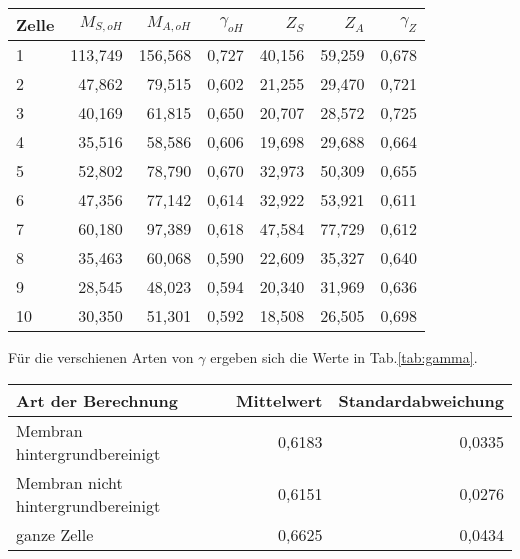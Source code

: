 \begin{center}
    \centering
    \begin{tabular}{lrrrrrr}
        \toprule
        Zelle &  $M_{S,oH}$ &  $M_{A,oH}$ &  $\gamma_{oH}$ &   $Z_S$ &   $Z_A$ &  $\gamma_Z$ \\
        \midrule
        1     & 113,749 & 156,568 &     0,727 & 40,156 & 59,259 &    0,678 \\
        2     &  47,862 &  79,515 &     0,602 & 21,255 & 29,470 &    0,721 \\
        3     &  40,169 &  61,815 &     0,650 & 20,707 & 28,572 &    0,725 \\
        4     &  35,516 &  58,586 &     0,606 & 19,698 & 29,688 &    0,664 \\
        5     &  52,802 &  78,790 &     0,670 & 32,973 & 50,309 &    0,655 \\
        6     &  47,356 &  77,142 &     0,614 & 32,922 & 53,921 &    0,611 \\
        7     &  60,180 &  97,389 &     0,618 & 47,584 & 77,729 &    0,612 \\
        8     &  35,463 &  60,068 &     0,590 & 22,609 & 35,327 &    0,640 \\
        9     &  28,545 &  48,023 &     0,594 & 20,340 & 31,969 &    0,636 \\
        10    &  30,350 &  51,301 &     0,592 & 18,508 & 26,505 &    0,698 \\
        \bottomrule
    \end{tabular}
    \label{tab:YFP2}
\end{center}

Für die verschienen Arten von $\gamma$ ergeben sich die Werte in Tab.\ref{tab:gamma}.

\begin{center}
    \centering
    \begin{tabular}{lrr}
        Art der Berechnung & Mittelwert & Standardabweichung \\
        \hline
        Membran hintergrundbereinigt & 0,6183 & 0,0335 \\
        Membran nicht hintergrundbereinigt & 0,6151 & 0,0276 \\
        ganze Zelle & 0,6625 & 0,0434 \\
        
    \end{tabular}
\end{center}
\label{tab:gamma}




